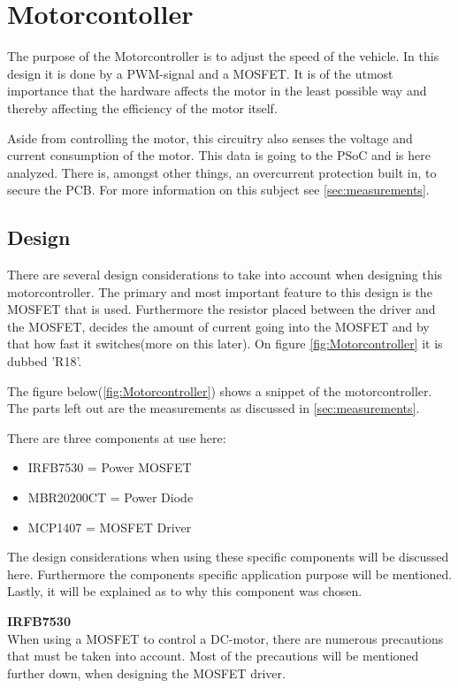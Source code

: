 \section{Motorcontoller}
The purpose of the Motorcontroller is to adjust the speed of the vehicle. In this design it is done by a PWM-signal and a MOSFET. It is of the utmost importance that the hardware affects the motor in the least possible way and thereby affecting the efficiency of the motor itself.

Aside from controlling the motor, this circuitry also senses the voltage and current consumption of the motor. This data is going to the PSoC and is here analyzed. There is, amongst other things, an overcurrent protection built in, to secure the PCB. For more information on this subject see \vref{sec:measurements}.

\subsection{Design}
There are several design considerations to take into account when designing this motorcontroller. The primary and most important feature to this design is the MOSFET that is used. Furthermore the resistor placed between the driver and the MOSFET, decides the amount of current going into the MOSFET and by that how fast it switches(more on this later). On figure \vref{fig:Motorcontroller} it is dubbed 'R18'. 

The figure below(\vref{fig:Motorcontroller}) shows a snippet of the motorcontroller. The parts left out are the measurements as discussed in \vref{sec:measurements}.

There are three components at use here:

\begin{itemize}
	\item{IRFB7530 = Power MOSFET}
	\item{MBR20200CT = Power Diode}
	\item{MCP1407 = MOSFET Driver}
\end{itemize}

The design considerations when using these specific components will be discussed here. Furthermore the components specific application purpose will be mentioned. Lastly, it will be explained as to why this component was chosen.  

\textbf{IRFB7530} \cite{IRFB7530}\\
When using a MOSFET to control a DC-motor, there are numerous precautions that must be taken into account. Most of the precautions will be mentioned further down, when designing the MOSFET driver. 

